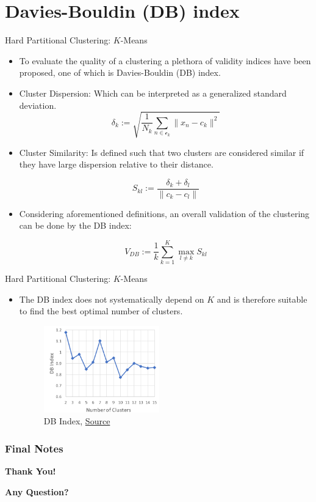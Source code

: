 \documentclass[compress,oilve]{beamer}
\newcommand{\tc}[2]{
	\textcolor{#1}{#2}
}
\begin{document}
\section{ Davies-Bouldin (DB) index}
\begin{frame}{Hard Partitional Clustering: $K$-Means}
	\begin{itemize}
		\item To evaluate the quality of a clustering a plethora of validity indices have been proposed, one of which is Davies-Bouldin (DB) index.
		
		\item \tc{keywords}{Cluster Dispersion:}Which can be interpreted as a generalized standard deviation.
		\begin{equation*}
			\delta_{k} := \sqrt{\frac{1}{N_k}\sum_{n\in\mathcal{c}_k}\|x_n-c_k\|^2}
		\end{equation*}
		
		\medskip
		\item \tc{keywords}{Cluster Similarity:} Is defined such that two clusters are considered similar if they have large dispersion relative to their distance.
		
		\begin{equation*}
			S_{kl} := \frac{\delta_{k}+\delta_{l}}{\| c_k-c_l\|}
		\end{equation*}
	
	
		\medskip
		\item Considering aforementioned definitions, an overall validation of the clustering can be done by the DB index:
		
		\begin{equation*}
			V_{DB} := \frac{1}{k}\sum_{k=1}^{K}\max_{l\neq k}S_{kl}
		\end{equation*}
	\end{itemize}

\end{frame}
\begin{frame}{Hard Partitional Clustering: $K$-Means}
	\begin{itemize}
		\item The DB index does not systematically depend on $K$ and is therefore suitable to find the best optimal number of clusters.

		\begin{figure}
		\includegraphics[width=5cm, height=3.75cm]{Figs/5.png}
		\caption{DB Index, \href{https://tinyurl.com/2hyqttw8}{Source}}
	\end{figure}
	\end{itemize}

\end{frame}

\frametitle{Final Notes}
\centering
\vspace{50 pt}
\textbf{Thank You!}
\vspace{50pt}

\textbf{Any Question?}
\end{document}
